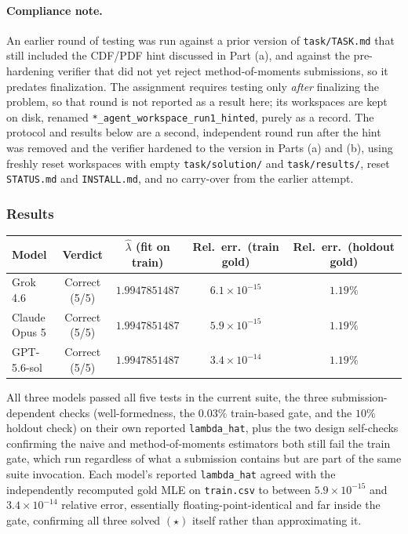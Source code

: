\documentclass[11pt]{article}
\begin{document}
\paragraph{Compliance note.} An earlier round of testing was run against a prior
version of \texttt{task/TASK.md} that still included the CDF/PDF hint discussed
in Part (a), and against the pre-hardening verifier that did not yet reject
method-of-moments submissions, so it predates finalization. The assignment
requires testing only \emph{after} finalizing the problem, so that round is not
reported as a result here; its workspaces are kept on disk, renamed
\texttt{*\_agent\_workspace\_run1\_hinted}, purely as a record. The protocol and
results below are a second, independent round run after the hint was removed and
the verifier hardened to the version in Parts (a) and (b), using freshly reset
workspaces with empty \texttt{task/solution/} and \texttt{task/results/}, reset
\texttt{STATUS.md} and \texttt{INSTALL.md}, and no carry-over from the earlier
attempt.

\subsubsection*{Results}

\begin{table}[h]
\centering
\small
\begin{tabular}{lcccc}
\toprule
Model & Verdict & $\hat\lambda$ (fit on train) & Rel.\ err.\ (train gold) & Rel.\ err.\ (holdout gold) \\
\midrule
Grok 4.6      & Correct (5/5) & $1.9947851487$ & $6.1\times10^{-15}$ & $1.19\%$ \\
Claude Opus 5 & Correct (5/5) & $1.9947851487$ & $5.9\times10^{-15}$ & $1.19\%$ \\
GPT-5.6-sol   & Correct (5/5) & $1.9947851487$ & $3.4\times10^{-14}$ & $1.19\%$ \\
\bottomrule
\end{tabular}
\end{table}

All three models passed all five tests in the current suite, the three
submission-dependent checks (well-formedness, the $0.03\%$ train-based gate, and
the $10\%$ holdout check) on their own reported \texttt{lambda\_hat}, plus the
two design self-checks confirming the naive and method-of-moments estimators
both still fail the train gate, which run regardless of what a submission
contains but are part of the same suite invocation. Each model's reported
\texttt{lambda\_hat} agreed with the independently recomputed gold MLE on
\texttt{train.csv} to between $5.9\times10^{-15}$ and $3.4\times10^{-14}$ relative
error, essentially floating-point-identical and far inside the gate, confirming
all three solved $(\star)$ itself rather than approximating it.
\end{document}

